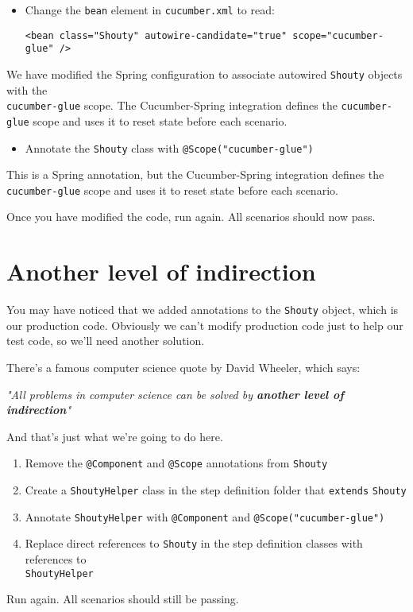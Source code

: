 \CYBERDOJO
{
    \begin{itemize}
        \item Change the \texttt{bean} element in \texttt{cucumber.xml} to read:
        
        \texttt{<bean class="Shouty" autowire-candidate="true" scope="cucumber-glue" />}
    \end{itemize}

    We have modified the Spring configuration to associate autowired \texttt{Shouty} objects with the \\ \texttt{cucumber-glue} scope. The Cucumber-Spring integration defines the \texttt{cucumber-glue} scope and uses it to reset state before each scenario.
}
{
    \begin{itemize}
        \item Annotate the \texttt{Shouty} class with \texttt{@Scope("cucumber-glue")}
    \end{itemize}

    This is a Spring annotation, but the Cucumber-Spring integration defines the \texttt{cucumber-glue} scope and uses it to reset state before each scenario.
}


Once you have modified the code, run \CUKE{} again. All scenarios should now pass.


\chapter*{Another level of indirection}

You may have noticed that we added annotations to the \texttt{Shouty} object, which is our production code. Obviously we can't modify production code just to help our test code, so we'll need another solution.

There's a famous computer science quote by David Wheeler, which says:

\setlength{\leftskip}{1cm}

    \textit{"All problems in computer science can be solved by \textbf{another level of indirection}"}

\setlength{\leftskip}{0pt}

And that's just what we're going to do here. 
\begin{enumerate}
    \item Remove the \texttt{@Component} and \texttt{@Scope} annotations from \texttt{Shouty}
    \item Create a \texttt{ShoutyHelper} class in the step definition folder that \texttt{extends} \texttt{Shouty}
    \item Annotate \texttt{ShoutyHelper} with \texttt{@Component} and \texttt{@Scope("cucumber-glue")}
    \item Replace direct references to \texttt{Shouty} in the step definition classes with references to\\ \texttt{ShoutyHelper}
\end{enumerate}

Run \CUKE{} again. All scenarios should still be passing.